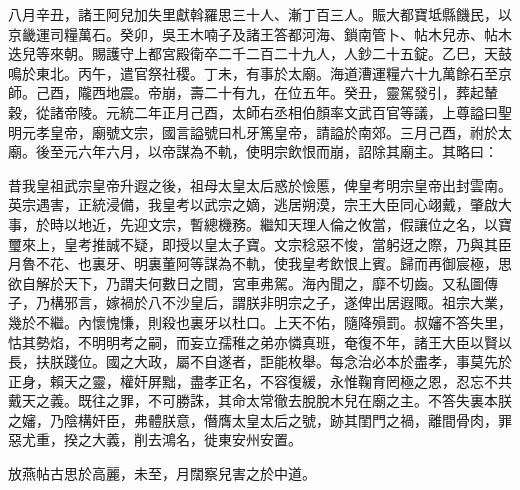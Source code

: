 \begin{pinyinscope}
 八月辛丑，諸王阿兒加失里獻斡羅思三十人、漸丁百三人。賑大都寶坻縣饑民，以京畿運司糧萬石。癸卯，吳王木喃子及諸王答都河海、鎖南管卜、帖木兒赤、帖木迭兒等來朝。賜護守上都宮殿衛卒二千二百二十九人，人鈔二十五錠。乙巳，天鼓鳴於東北。丙午，遣官祭社稷。丁未，有事於太廟。海道漕運糧六十九萬餘石至京師。己酉，隴西地震。帝崩，壽二十有九，在位五年。癸丑，靈駕發引，葬起輦穀，從諸帝陵。元統二年正月己酉，太師右丞相伯顏率文武百官等議，上尊謚曰聖明元孝皇帝，廟號文宗，國言謚號曰札牙篤皇帝，請謚於南郊。三月己酉，祔於太廟。後至元六年六月，以帝謀為不軌，使明宗飲恨而崩，詔除其廟主。其略曰：



 昔我皇祖武宗皇帝升遐之後，祖母太皇太后惑於憸慝，俾皇考明宗皇帝出封雲南。英宗遇害，正統浸備，我皇考以武宗之嫡，逃居朔漠，宗王大臣同心翊戴，肇啟大事，於時以地近，先迎文宗，暫總機務。繼知天理人倫之攸當，假讓位之名，以寶璽來上，皇考推誠不疑，即授以皇太子寶。文宗稔惡不悛，當躬迓之際，乃與其臣月魯不花、也裏牙、明裏董阿等謀為不軌，使我皇考飲恨上賓。歸而再御宸極，思欲自解於天下，乃謂夫何數日之間，宮車弗駕。海內聞之，靡不切齒。又私圖傳子，乃構邪言，嫁禍於八不沙皇后，謂朕非明宗之子，遂俾出居遐陬。祖宗大業，幾於不繼。內懷愧慊，則殺也裏牙以杜口。上天不佑，隨降殞罰。叔嬸不答失里，怙其勢焰，不明明考之嗣，而妄立孺稚之弟亦憐真班，奄復不年，諸王大臣以賢以長，扶朕踐位。國之大政，屬不自遂者，詎能枚舉。每念治必本於盡孝，事莫先於正身，賴天之靈，權奸屏黜，盡孝正名，不容復緩，永惟鞠育罔極之恩，忍忘不共戴天之義。既往之罪，不可勝誅，其命太常徹去脫脫木兒在廟之主。不答失裏本朕之嬸，乃陰構奸臣，弗體朕意，僭膺太皇太后之號，跡其閨門之禍，離間骨肉，罪惡尤重，揆之大義，削去鴻名，徙東安州安置。



 放燕帖古思於高麗，未至，月闊察兒害之於中道。



\end{pinyinscope}